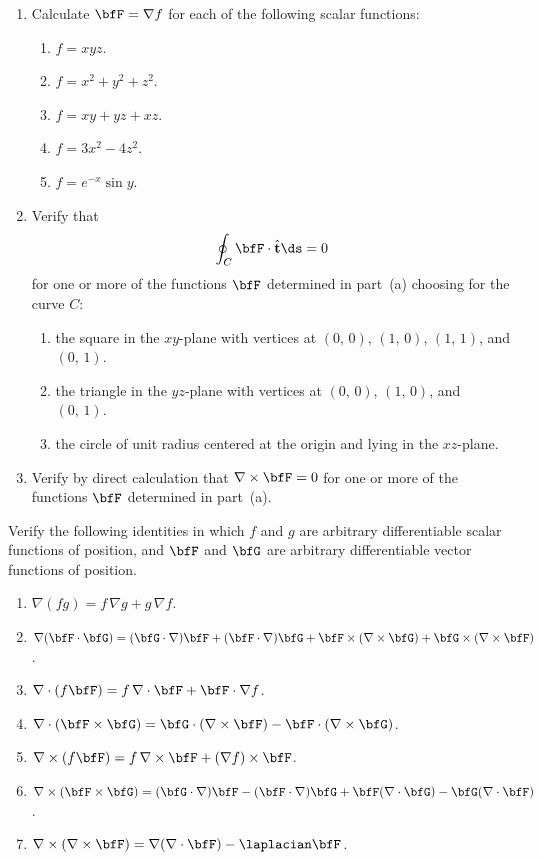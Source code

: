 \begin{problems}

\prob
\begin{enumerate}[label=(\alph*)]
\item Calculate $\bfF = \nabla f$ for each of the following scalar functions:
  \begin{enumerate}[label=(\roman*)]
  \item $f = xyz$.
  \item $f = x^2 + y^2 + z^2$.
  \item $f = xy + yz + xz$.
  \item $f = 3x^2 - 4z^2$.
  \item $f = e^{-x}\sin y$.
  \end{enumerate}
\item Verify that
  \[
  \oint_C \bfF\cdot\hat{\mathbf{t}}\ds = 0
  \]
  for one or more of the functions $\bfF$ determined in part~(a)
  choosing for the curve $C$:
  \begin{enumerate}[label=(\roman*)]
  \item the square in the $xy$-plane with vertices at $(0,\,0)$,
    $(1,\,0)$, $(1,\,1)$, and $(0,\,1)$.
  \item the triangle in the $yz$-plane with vertices at $(0,\,0)$,
    $(1,\,0)$, and $(0,\,1)$.
  \item the circle of unit radius centered at the origin and lying in
    the $xz$-plane.
  \end{enumerate}
\item Verify by direct calculation that $\nabla\times\bfF = 0$ for one
  or more of the functions $\bfF$ determined in part~(a).
\end{enumerate}

\prob
Verify the following identities in which $f$ and $g$ are arbitrary
differentiable scalar functions of position, and $\bfF$ and $\bfG$
are arbitrary differentiable vector functions of position.
\begin{enumerate}[label=(\alph*)]
\item $\nabla(fg) = f\,\nabla g + g\,\nabla f$.
\item $\nabla(\bfF\cdot\bfG) = (\bfG\cdot\nabla)\bfF
  + (\bfF\cdot\nabla)\bfG + \bfF\times(\nabla\times\bfG)
  + \bfG\times(\nabla\times\bfF)$.
\item $\nabla\cdot(f\bfF) = f\,\nabla\cdot\bfF
  + \bfF\cdot\nabla f$.
\item $\nabla\cdot(\bfF\times\bfG) = \bfG\cdot(\nabla\times\bfF)
  - \bfF\cdot(\nabla\times\bfG)$.
\item $\nabla\times(f\bfF) = f\,\nabla\times\bfF
  + (\nabla f)\times\bfF$.
\item $\nabla\times(\bfF\times\bfG) = (\bfG\cdot\nabla)\bfF
  - (\bfF\cdot\nabla)\bfG + \bfF(\nabla\cdot\bfG)
  - \bfG(\nabla\cdot\bfF)$.
\item $\nabla\times(\nabla\times\bfF)
  = \nabla(\nabla\cdot\bfF) - \laplacian\bfF$.
\end{enumerate}


\end{problems}
